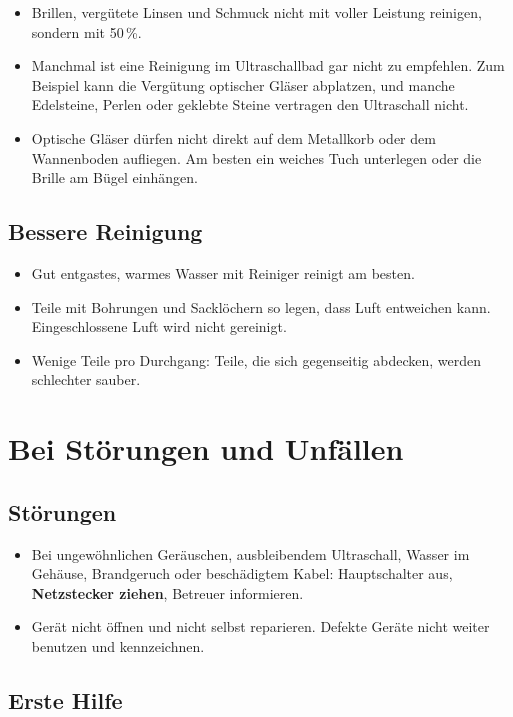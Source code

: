 \documentclass{\basedir/fablab-document}
\begin{document}
	\begin{itemize}
		\item Brillen, vergütete Linsen und Schmuck nicht mit voller Leistung reinigen, sondern mit 50\,\%.
		\item Manchmal ist eine Reinigung im Ultraschallbad gar nicht zu empfehlen. Zum Beispiel kann die Vergütung optischer Gläser abplatzen, und manche Edelsteine, Perlen oder geklebte Steine vertragen den Ultraschall nicht.
		\item Optische Gläser dürfen nicht direkt auf dem Metallkorb oder dem Wannenboden aufliegen. Am besten ein weiches Tuch unterlegen oder die Brille am Bügel einhängen.
	\end{itemize}

	\subsection{Bessere Reinigung}

	\begin{itemize}
		\item Gut entgastes, warmes Wasser mit Reiniger reinigt am besten.
		\item Teile mit Bohrungen und Sacklöchern so legen, dass Luft entweichen kann. Eingeschlossene Luft wird nicht gereinigt.
		\item Wenige Teile pro Durchgang: Teile, die sich gegenseitig abdecken, werden schlechter sauber.
	\end{itemize}

	\section{Bei Störungen und Unfällen}

	\subsection{Störungen}

	\begin{itemize}
		\item Bei ungewöhnlichen Geräuschen, ausbleibendem Ultraschall, Wasser im Gehäuse, Brandgeruch oder beschädigtem Kabel: Hauptschalter aus, \textbf{Netzstecker ziehen}, Betreuer informieren.
		\item Gerät nicht öffnen und nicht selbst reparieren. Defekte Geräte nicht weiter benutzen und kennzeichnen.
	\end{itemize}

	\subsection{Erste Hilfe}
\end{document}
